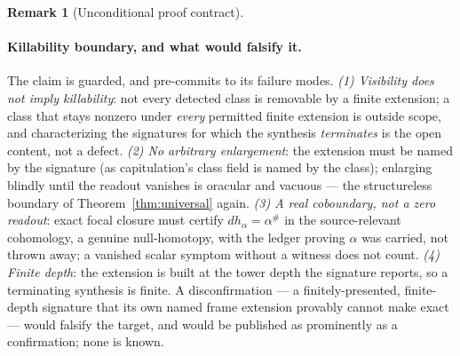 \documentclass[11pt]{article}
\theoremstyle{definition}
\newtheorem{remark}[theorem]{Remark}
\begin{document}
\begin{remark}[Unconditional proof contract]
\begin{enumerate}
\paragraph{Killability boundary, and what would falsify it.} The claim is guarded, and pre-commits to its failure
modes. \emph{(1) Visibility does not imply killability}: not every detected class is removable by a finite
extension; a class that stays nonzero under \emph{every} permitted finite extension is outside scope, and
characterizing the signatures for which the synthesis \emph{terminates} is the open content, not a defect.
\emph{(2) No arbitrary enlargement}: the extension must be named by the signature (as capitulation's class field
is named by the class); enlarging blindly until the readout vanishes is oracular and vacuous --- the
structureless boundary of Theorem~\ref{thm:universal} again. \emph{(3) A real coboundary, not a zero readout}:
exact focal closure must certify $d h_\alpha=\alpha^\#$ in the source-relevant cohomology, a genuine
null-homotopy, with the ledger proving $\alpha$ was carried, not thrown away; a vanished scalar symptom without a
witness does not count. \emph{(4) Finite depth}: the extension is built at the tower depth the signature reports,
so a terminating synthesis is finite. A disconfirmation --- a finitely-presented, finite-depth signature that its
own named frame extension provably cannot make exact --- would falsify the target, and would be published as
prominently as a confirmation; none is known.


\end{enumerate}
\end{remark}
\end{document}
